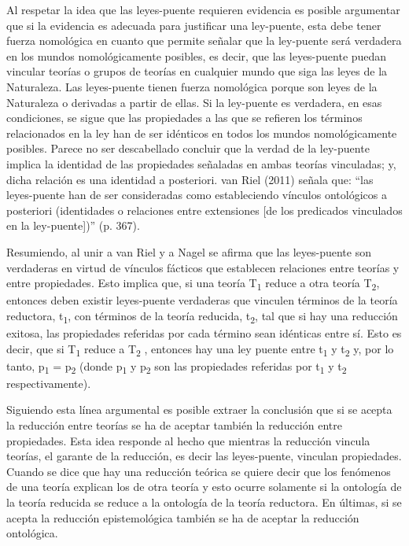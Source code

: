 \documentclass[]{book}
\begin{document}
\begin{refsection}
Al respetar la idea que las leyes-puente requieren evidencia es posible
argumentar que si la evidencia es adecuada para justificar una
ley-puente, esta debe tener fuerza nomológica en cuanto que permite
señalar que la ley-puente será verdadera en los mundos nomológicamente
posibles, es decir, que las leyes-puente puedan vincular teorías o
grupos de teorías en cualquier mundo que siga las leyes de la
Naturaleza. Las leyes-puente tienen fuerza nomológica porque son leyes
de la Naturaleza o derivadas a partir de ellas. Si la ley-puente es
verdadera, en esas condiciones, se sigue que las propiedades a las que
se refieren los términos relacionados en la ley han de ser idénticos en
todos los mundos nomológicamente posibles. Parece no ser descabellado
concluir que la verdad de la ley-puente implica la identidad de las
propiedades señaladas en ambas teorías vinculadas; y, dicha relación es
una identidad a posteriori. van Riel (2011) señala que: ``las
leyes-puente han de ser consideradas como estableciendo vínculos
ontológicos a posteriori (identidades o relaciones entre extensiones
{[}de los predicados vinculados en la ley-puente{]})'' (p. 367).

Resumiendo, al unir a van Riel y a Nagel se afirma que las leyes-puente
son verdaderas en virtud de vínculos fácticos que establecen relaciones
entre teorías y entre propiedades. Esto implica que, si una teoría
T\textsubscript{1} reduce a otra teoría T\textsubscript{2}, entonces
deben existir leyes-puente verdaderas que vinculen términos de la teoría
reductora, t\textsubscript{1}, con términos de la teoría reducida,
t\textsubscript{2}, tal que si hay una reducción exitosa, las
propiedades referidas por cada término sean idénticas entre sí. Esto es
decir, que si T\textsubscript{1} reduce a T\textsubscript{2} , entonces
hay una ley puente entre t\textsubscript{1} y t\textsubscript{2} y, por
lo tanto, p\textsubscript{1} = p\textsubscript{2} (donde
p\textsubscript{1} y p\textsubscript{2} son las propiedades referidas
por t\textsubscript{1} y t\textsubscript{2} respectivamente).

Siguiendo esta línea argumental es posible extraer la conclusión que si
se acepta la reducción entre teorías se ha de aceptar también la
reducción entre propiedades. Esta idea responde al hecho que mientras la
reducción vincula teorías, el garante de la reducción, es decir las
leyes-puente, vinculan propiedades. Cuando se dice que hay una reducción
teórica se quiere decir que los fenómenos de una teoría explican los de
otra teoría y esto ocurre solamente si la ontología de la teoría
reducida se reduce a la ontología de la teoría reductora. En últimas, si
se acepta la reducción epistemológica también se ha de aceptar la
reducción ontológica.


\end{refsection}
\end{document}
